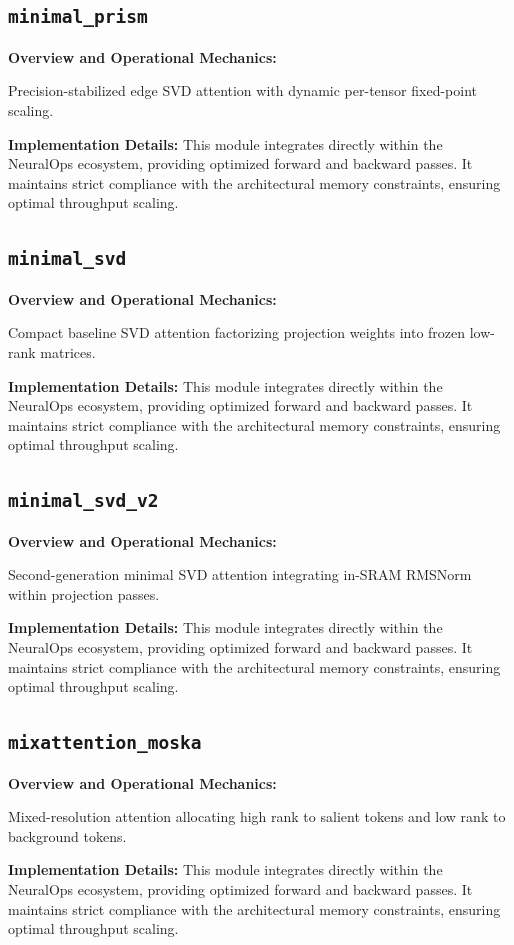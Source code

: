 \documentclass[10pt,twocolumn,letterpaper]{article}
\begin{document}
\subsection{\texttt{minimal\_prism}}
\textbf{Overview and Operational Mechanics:}

Precision-stabilized edge SVD attention with dynamic per-tensor fixed-point scaling.

\textbf{Implementation Details:}
This module integrates directly within the NeuralOps ecosystem, providing optimized forward and backward passes. It maintains strict compliance with the architectural memory constraints, ensuring optimal throughput scaling.

\subsection{\texttt{minimal\_svd}}
\textbf{Overview and Operational Mechanics:}

Compact baseline SVD attention factorizing projection weights into frozen low-rank matrices.

\textbf{Implementation Details:}
This module integrates directly within the NeuralOps ecosystem, providing optimized forward and backward passes. It maintains strict compliance with the architectural memory constraints, ensuring optimal throughput scaling.

\subsection{\texttt{minimal\_svd\_v2}}
\textbf{Overview and Operational Mechanics:}

Second-generation minimal SVD attention integrating in-SRAM RMSNorm within projection passes.

\textbf{Implementation Details:}
This module integrates directly within the NeuralOps ecosystem, providing optimized forward and backward passes. It maintains strict compliance with the architectural memory constraints, ensuring optimal throughput scaling.

\subsection{\texttt{mixattention\_moska}}
\textbf{Overview and Operational Mechanics:}

Mixed-resolution attention allocating high rank to salient tokens and low rank to background tokens.

\textbf{Implementation Details:}
This module integrates directly within the NeuralOps ecosystem, providing optimized forward and backward passes. It maintains strict compliance with the architectural memory constraints, ensuring optimal throughput scaling.
\end{document}
